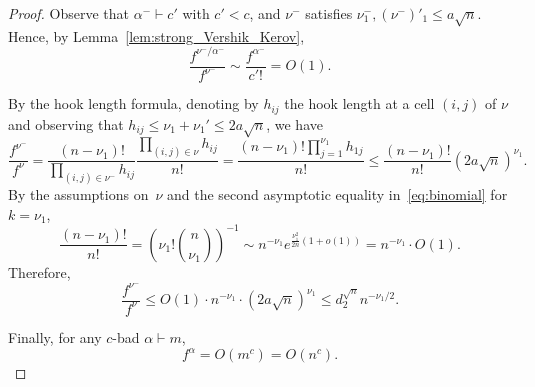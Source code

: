\documentclass[12pt]%
{amsart}
\newcommand{\al}{{\alpha}}
\theoremstyle{plain}
\theoremstyle{definition}
\theoremstyle{remark}
\begin{document}
\begin{proof}
Observe that $\al^-\vdash c'$ with $c' < c$, and $\nu^-$ satisfies
$\nu^-_1,(\nu^-)'_1\le a\sqrt n$.
Hence, by Lemma~\ref{lem:strong_Vershik_Kerov},
\begin{equation}\label{eq:factor2}
    \frac{f^{\nu^-/\al^-}}{f^{\nu^-}}
    \sim \frac{f^{\al^-}}{c'!}
    = O(1).
\end{equation}

By the hook length formula, denoting by $h_{ij}$ the hook length at a cell $(i,j)$ of $\nu$ and observing that $h_{ij} \le \nu_1 + \nu_1' \le 2a \sqrt{n}$, we have
\[
    \frac{f^{\nu^-}}{f^\nu}
    = \frac{(n-\nu_1)!}{\prod_{(i,j)\in\nu^-}h_{ij}}
    \frac{\prod_{(i,j)\in\nu}h_{ij}}{n!}
    =\frac{(n-\nu_1)!\prod_{j=1}^{\nu_1}h_{1j}}{n!}
    \le\frac{(n-\nu_1)!}{n!}(2a\sqrt{n})^{\nu_1}.
\]
By the assumptions on~$\nu$ and the second asymptotic equality in~\eqref{eq:binomial} for $k = \nu_1$, 
\[
    \frac{(n-\nu_1)!}{n!} 
    = \left( \nu_1! \binom{n}{\nu_1} \right)^{-1}
    \sim  n^{-\nu_1} e^{\frac{\nu_1^2}{2n}(1 + o(1))} = n^{-\nu_1} \cdot O(1).
\]
Therefore,
\begin{equation}\label{eq:factor3}
   \frac{f^{\nu^-}}{f^\nu}
   \le O(1) \cdot n^{-\nu_1} \cdot
   (2a\sqrt{n})^{\nu_1}
   \le  d_2^{\sqrt n} n^{-\nu_1/2}.
\end{equation}

Finally, for any $c$-bad $\al \vdash m$, 
\begin{equation}\label{eq:factor4}
    f^\al = O(m^c) = O(n^c).
\end{equation} 


\end{proof}
\end{document}

